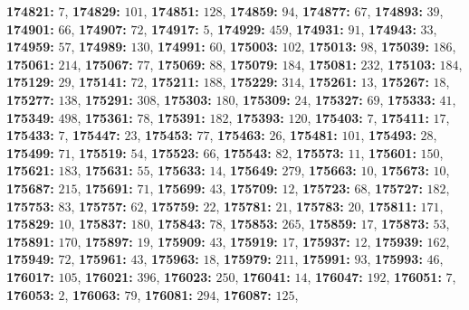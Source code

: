 \textsf{\bfseries 174821:} $7$, \textsf{\bfseries 174829:} $101$, \textsf{\bfseries 174851:} $128$, \textsf{\bfseries 174859:} $94$, \textsf{\bfseries 174877:} $67$, \textsf{\bfseries 174893:} $39$, \textsf{\bfseries 174901:} $66$, \textsf{\bfseries 174907:} $72$, \textsf{\bfseries 174917:} $5$, \textsf{\bfseries 174929:} $459$, \textsf{\bfseries 174931:} $91$, \textsf{\bfseries 174943:} $33$, \textsf{\bfseries 174959:} $57$, \textsf{\bfseries 174989:} $130$, \textsf{\bfseries 174991:} $60$, \textsf{\bfseries 175003:} $102$, \textsf{\bfseries 175013:} $98$, \textsf{\bfseries 175039:} $186$, \textsf{\bfseries 175061:} $214$, \textsf{\bfseries 175067:} $77$, \textsf{\bfseries 175069:} $88$, \textsf{\bfseries 175079:} $184$, \textsf{\bfseries 175081:} $232$, \textsf{\bfseries 175103:} $184$, \textsf{\bfseries 175129:} $29$, \textsf{\bfseries 175141:} $72$, \textsf{\bfseries 175211:} $188$, \textsf{\bfseries 175229:} $314$, \textsf{\bfseries 175261:} $13$, \textsf{\bfseries 175267:} $18$, \textsf{\bfseries 175277:} $138$, \textsf{\bfseries 175291:} $308$, \textsf{\bfseries 175303:} $180$, \textsf{\bfseries 175309:} $24$, \textsf{\bfseries 175327:} $69$, \textsf{\bfseries 175333:} $41$, \textsf{\bfseries 175349:} $498$, \textsf{\bfseries 175361:} $78$, \textsf{\bfseries 175391:} $182$, \textsf{\bfseries 175393:} $120$, \textsf{\bfseries 175403:} $7$, \textsf{\bfseries 175411:} $17$, \textsf{\bfseries 175433:} $7$, \textsf{\bfseries 175447:} $23$, \textsf{\bfseries 175453:} $77$, \textsf{\bfseries 175463:} $26$, \textsf{\bfseries 175481:} $101$, \textsf{\bfseries 175493:} $28$, \textsf{\bfseries 175499:} $71$, \textsf{\bfseries 175519:} $54$, \textsf{\bfseries 175523:} $66$, \textsf{\bfseries 175543:} $82$, \textsf{\bfseries 175573:} $11$, \textsf{\bfseries 175601:} $150$, \textsf{\bfseries 175621:} $183$, \textsf{\bfseries 175631:} $55$, \textsf{\bfseries 175633:} $14$, \textsf{\bfseries 175649:} $279$, \textsf{\bfseries 175663:} $10$, \textsf{\bfseries 175673:} $10$, \textsf{\bfseries 175687:} $215$, \textsf{\bfseries 175691:} $71$, \textsf{\bfseries 175699:} $43$, \textsf{\bfseries 175709:} $12$, \textsf{\bfseries 175723:} $68$, \textsf{\bfseries 175727:} $182$, \textsf{\bfseries 175753:} $83$, \textsf{\bfseries 175757:} $62$, \textsf{\bfseries 175759:} $22$, \textsf{\bfseries 175781:} $21$, \textsf{\bfseries 175783:} $20$, \textsf{\bfseries 175811:} $171$, \textsf{\bfseries 175829:} $10$, \textsf{\bfseries 175837:} $180$, \textsf{\bfseries 175843:} $78$, \textsf{\bfseries 175853:} $265$, \textsf{\bfseries 175859:} $17$, \textsf{\bfseries 175873:} $53$, \textsf{\bfseries 175891:} $170$, \textsf{\bfseries 175897:} $19$, \textsf{\bfseries 175909:} $43$, \textsf{\bfseries 175919:} $17$, \textsf{\bfseries 175937:} $12$, \textsf{\bfseries 175939:} $162$, \textsf{\bfseries 175949:} $72$, \textsf{\bfseries 175961:} $43$, \textsf{\bfseries 175963:} $18$, \textsf{\bfseries 175979:} $211$, \textsf{\bfseries 175991:} $93$, \textsf{\bfseries 175993:} $46$, \textsf{\bfseries 176017:} $105$, \textsf{\bfseries 176021:} $396$, \textsf{\bfseries 176023:} $250$, \textsf{\bfseries 176041:} $14$, \textsf{\bfseries 176047:} $192$, \textsf{\bfseries 176051:} $7$, \textsf{\bfseries 176053:} $2$, \textsf{\bfseries 176063:} $79$, \textsf{\bfseries 176081:} $294$, \textsf{\bfseries 176087:} $125$, 
